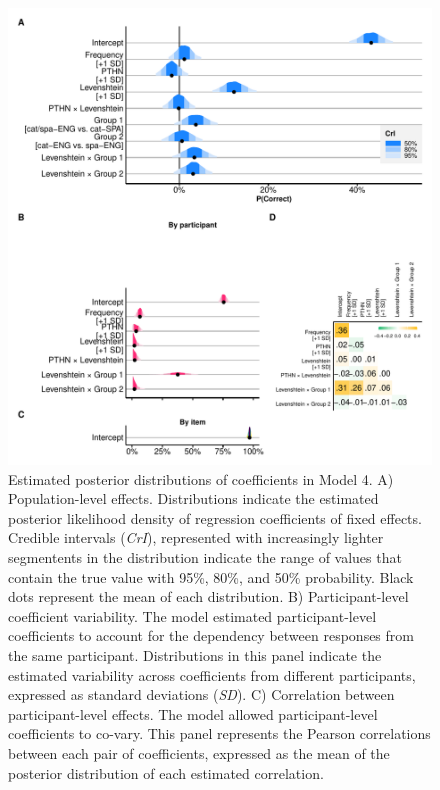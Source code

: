 \documentclass[
  english,
  man,floatsintext]{apa7}
\begin{document}
\begin{figure}
\centering
\includegraphics{manuscript_files/figure-latex/posteriorfix-1.pdf}
\caption{\label{fig:posteriorfix}Estimated posterior distributions of coefficients in Model 4. A) Population-level effects. Distributions indicate the estimated posterior likelihood density of regression coefficients of fixed effects. Credible intervals (\emph{CrI}), represented with increasingly lighter segmentents in the distribution indicate the range of values that contain the true value with 95\%, 80\%, and 50\% probability. Black dots represent the mean of each distribution. B) Participant-level coefficient variability. The model estimated participant-level coefficients to account for the dependency between responses from the same participant. Distributions in this panel indicate the estimated variability across coefficients from different participants, expressed as standard deviations (\emph{SD}). C) Correlation between participant-level effects. The model allowed participant-level coefficients to co-vary. This panel represents the Pearson correlations between each pair of coefficients, expressed as the mean of the posterior distribution of each estimated correlation.}
\end{figure}
\end{document}
